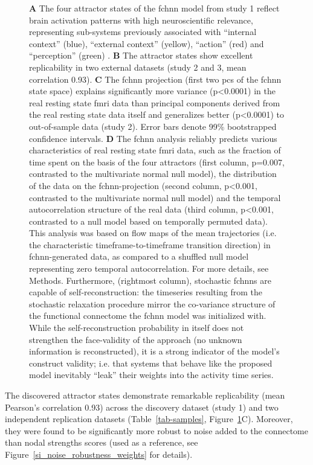 \documentclass{article}
\begin{document}
\begin{figure}[!htbp]
{\textbf{A} The four attractor states of the \acrshort{fchnn} model from study 1 reflect brain activation
patterns with high neuroscientific relevance, representing sub-systems previously associated with ``internal context''
(blue), ``external context'' (yellow), ``action'' (red) and ``perception'' (green)
\citep{golland2008data, cioli2014differences, chen2018human, fuster2004upper, margulies2016situating}.
\textbf{B} The attractor states show excellent replicability in two external datasets (study 2 and 3, mean correlation 0.93).
\textbf{C} The \acrshort{fchnn} projection (first two \acrshort{pc}s of the \acrshort{fchnn} state space) explains significantly more variance (p\textless 0.0001) in the real
resting state \acrshort{fmri} data than principal components derived from the real resting state data itself and generalizes
better (p\textless 0.0001) to out-of-sample data (study 2). Error bars denote 99\% bootstrapped confidence intervals.
\textbf{D} The \acrshort{fchnn} analysis reliably predicts various characteristics of real resting state \acrshort{fmri} data, such as the fraction of time spent on the basis of the four attractors (first column, p=0.007, contrasted to the multivariate normal null model), the distribution of the data on the \acrshort{fchnn}-projection (second column, p\textless 0.001, contrasted to the multivariate normal null model) and the temporal autocorrelation structure of the real data (third column, p\textless 0.001, contrasted to a null model based on temporally permuted data). This analysis was based on flow maps of the mean trajectories (i.e. the characteristic timeframe-to-timeframe transition direction) in \acrshort{fchnn}-generated data, as compared to a shuffled null model representing zero temporal autocorrelation. For more details, see Methods. Furthermore, (rightmost column), stochastic \acrshort{fchnn}s are capable of self-reconstruction: the timeseries resulting from the stochastic relaxation procedure mirror the co-variance structure of the functional connectome the \acrshort{fchnn} model was initialized with. While the self-reconstruction probability in itself does not strengthen the face-validity of the approach (no unknown information is reconstructed), it is a strong indicator of the model's construct validity; i.e. that systems that behave like the proposed model inevitably ``leak'' their weights into the activity time series.}
\label{rest-validity}
\end{figure}

The discovered attractor states demonstrate remarkable replicability (mean Pearson's correlation 0.93) across the discovery dataset (study 1) and two independent replication datasets (Table~\ref{tab-samples}, Figure~\ref{rest-validity}C). Moreover, they were found to be significantly more robust to noise added to the connectome than nodal strengths scores (used as a reference, see Figure~\ref{si_noise_robustness_weights} for details).
\end{document}
